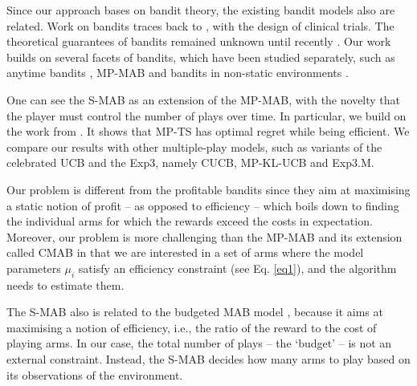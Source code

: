Since our approach bases on bandit theory, the existing bandit models also are related. Work on bandits traces back to \cite{Thompson1933}, with the design of clinical trials. %
The theoretical guarantees of bandits remained unknown until recently \cite{DBLP:journals/eccc/ECCC-TR00-068,DBLP:journals/ml/AuerCF02,Garivier2008, DBLP:conf/alt/KaufmannKM12}. Our work builds on several facets of bandits, which have been studied separately, such as anytime bandits \cite{DBLP:conf/soda/Kleinberg06, DBLP:conf/icml/DegenneP16}%
, \gls{MP-MAB} \cite{1104491,DBLP:conf/alt/UchiyaNK10, DBLP:conf/icml/KomiyamaHN15} %
and bandits in non-static environments \cite{DBLP:journals/siamcomp/AuerCFS02, DBLP:conf/colt/SlivkinsU08, DBLP:conf/alt/GarivierM11}. %

One can see the \gls{S-MAB} as an extension of the \gls{MP-MAB}, with the novelty that the player must control the number of plays over time. 
In particular, we build on the work from \cite{DBLP:conf/icml/KomiyamaHN15}.
It shows that \gls{MP-TS} has optimal regret while being efficient. We compare our results with other multiple-play models, such as variants of the celebrated \gls{UCB} and the \gls{Exp3}, namely \gls{CUCB}, \gls{MP-KL-UCB} and \gls{Exp3.M}. 

Our problem is different from the profitable bandits \cite{DBLP:conf/acml/AchabCG18} since they aim at maximising a static notion of profit -- as opposed to efficiency -- which boils down to finding the individual arms for which the rewards exceed the costs in expectation. 
Moreover, our problem is more challenging than the \gls{MP-MAB} and its extension called \gls{CMAB} in that we are interested in a set of arms where the model parameters $\mu_i$ satisfy an efficiency constraint (see Eq. \eqref{eq1}), and the algorithm needs to estimate them.

The \gls{S-MAB} also is related to the budgeted \gls{MAB} model \cite{DBLP:conf/aaai/LongCCRJ10, DBLP:conf/ijcai/XiaQMYL16}%
, because it aims at maximising a notion of efficiency, i.e., the ratio of the reward to the cost of playing arms.
In our case, the total number of plays -- the `budget' -- is not an external constraint. Instead, the \gls{S-MAB} decides how many arms to play based on its observations of the environment. %

